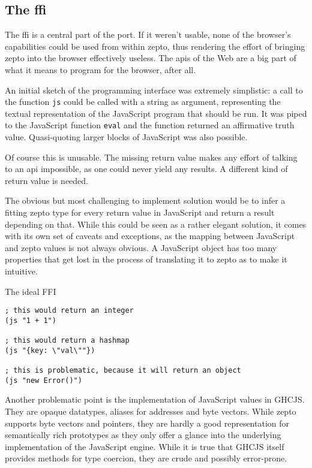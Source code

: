 \documentclass[oneside,11pt,xetex]{scrbook}
\begin{document}
\subsection{The \gls{ffi}}

The \gls{ffi} is a central part of the port. If it weren't usable, none of the browser's
capabilities could be used from within zepto, thus rendering the effort of bringing zepto into
the browser effectively useless. The \gls{api}s of the Web are a big part of what it means to
program for the browser, after all.

An initial sketch of the programming interface was extremely simplistic: a call to the
function \texttt{js} could be called with a string as argument, representing the textual
representation of the JavaScript program that should be run. It was piped to the JavaScript
function \texttt{eval} and the function returned an affirmative truth value. Quasi-quoting
larger blocks of JavaScript was also possible.

Of course this is unusable. The missing return value makes any effort of talking to an
\gls{api} impossible, as one could never yield any results. A different kind of return
value is needed.

The obvious but most challenging to implement solution would be to infer a fitting zepto
type for every return value in JavaScript and return a result depending on that. While
this could be seen as a rather elegant solution, it comes with its own set of caveats
and exceptions, as the mapping between JavaScript and zepto values is not always obvious.
A JavaScript object has too many properties that get lost in the process of translating
it to zepto as to make it intuitive.

\begin{listing}[H]
\caption{The ideal FFI}
\begin{verbatim}
; this would return an integer
(js "1 + 1")

; this would return a hashmap
(js "{key: \"val\""})

; this is problematic, because it will return an object
(js "new Error()")
\end{verbatim}
\end{listing}

Another problematic point is the implementation of JavaScript values in GHCJS. They
are opaque datatypes, aliases for addresses and byte vectors. While zepto supports
byte vectors and pointers, they are hardly a good representation for semantically rich
prototypes as they only offer a glance into the underlying implementation of the
JavaScript engine. While it is true that GHCJS itself provides methods for type
coercion, they are crude and possibly error-prone.
\end{document}
